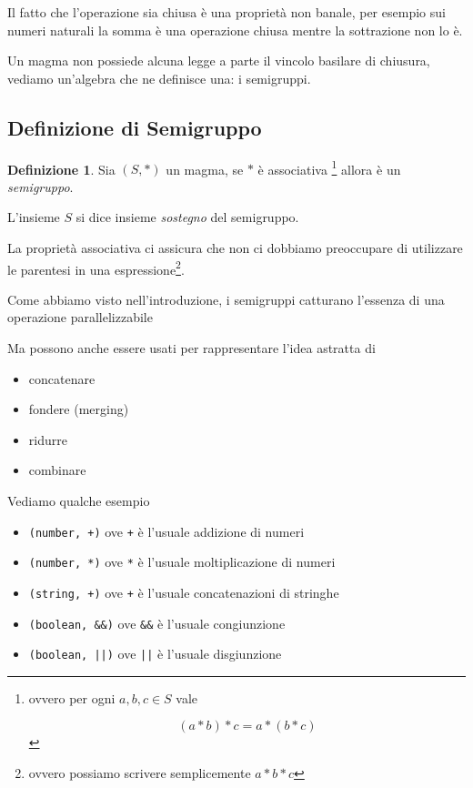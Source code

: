 \documentclass[12pt]{article}
\theoremstyle{definition}
\newtheorem{definition}{Definizione}[section]
\begin{document}
Il fatto che l'operazione sia chiusa è una proprietà non banale,
per esempio sui numeri naturali la somma è una operazione chiusa mentre la sottrazione non lo è.

Un magma non possiede alcuna legge a parte il vincolo basilare di chiusura, vediamo un'algebra che ne definisce una: i semigruppi.

\subsection{Definizione di Semigruppo}

\begin{definition}
Sia $(S, *)$ un magma, se $*$ è associativa \footnote{ovvero per ogni $a, b, c \in S$ vale

$$
(a * b) * c = a * ( b * c )
$$
} allora è un \emph{semigruppo}.
\end{definition}

L'insieme $S$ si dice insieme \emph{sostegno} del semigruppo.

La proprietà associativa ci assicura che non ci dobbiamo preoccupare di utilizzare le parentesi in una espressione\footnote{ovvero possiamo scrivere semplicemente $a * b * c$}.

Come abbiamo visto nell'introduzione, i semigruppi catturano l'essenza di una operazione parallelizzabile

Ma possono anche essere usati per rappresentare l'idea astratta di

\begin{itemize}
  \item concatenare
  \item fondere (merging)
  \item ridurre
  \item combinare
\end{itemize}

Vediamo qualche esempio

\begin{itemize}
  \item \texttt{(number, +)} ove \texttt{+} è l'usuale addizione di numeri
  \item \texttt{(number, *)} ove \texttt{*} è l'usuale moltiplicazione di numeri
  \item \texttt{(string, +)} ove \texttt{+} è l'usuale concatenazioni di stringhe
  \item \texttt{(boolean, \&\&)} ove \texttt{\&\&} è l'usuale congiunzione
  \item \texttt{(boolean, ||)} ove \texttt{||} è l'usuale disgiunzione
\end{itemize}
\end{document}
